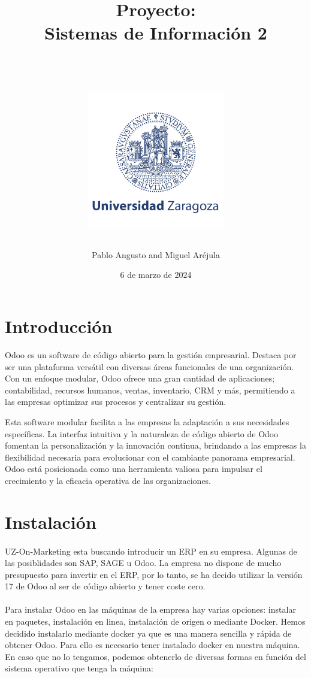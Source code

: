\documentclass[paper=a4wide, fontsize=11pt]{report}	 %
\title{
{\Huge \textbf{Proyecto: 
\\ Sistemas de Información 2}}\\
\vspace{1cm}
\vspace{1cm}
\text{Pablo Angusto\quad\href{mailto:842255@unizar.es}{842255@unizar.es}}\\
\text{Miguel Aréjula\quad\href{mailto:850068@unizar.es}{850068@unizar.es}}\\
\includegraphics[width=6cm]{logo.png}\\
\date{6 de marzo de 2024}



}
\begin{document}
\author{Pablo Angusto and Miguel Aréjula}
\maketitle %
\tableofcontents
\newpage
\thispagestyle{fancy} %

\vspace{-0.5cm}

\section{Introducción}

Odoo es un software de código abierto para la gestión empresarial. Destaca por ser una plataforma versátil con diversas áreas funcionales de una organización. Con un enfoque modular, Odoo ofrece una gran cantidad de aplicaciones; contabilidad, recursos humanos, ventas, inventario, CRM y más, permitiendo a las empresas optimizar sus procesos y centralizar su gestión.


Esta software modular facilita a las empresas la adaptación a sus necesidades específicas. La interfaz intuitiva y la naturaleza de código abierto de Odoo fomentan la personalización y la innovación continua, brindando a las empresas la flexibilidad necesaria para evolucionar con el cambiante panorama empresarial. Odoo está posicionada como una herramienta valiosa para impulsar el crecimiento y la eficacia operativa de las organizaciones.

\section{Instalación}
\paragraph{}
UZ-On-Marketing esta buscando introducir un ERP en su empresa. Algunas de las posiblidades son SAP, SAGE u Odoo. La empresa no dispone de mucho presupuesto para invertir en el ERP, por lo tanto, se ha decido utilizar la versión 17 de Odoo al ser de código abierto y tener coste cero.

\paragraph{}
Para instalar Odoo en las máquinas de la empresa hay varias opciones: instalar en paquetes, instalación en linea, instalación de origen o mediante Docker.
Hemos decidido instalarlo mediante docker ya que es una manera sencilla y rápida de obtener Odoo. 
Para ello es necesario tener instalado docker en nuestra máquina. En caso que no lo tengamos, podemos obtenerlo de diversas formas en función del  sistema operativo que tenga la máquina: 
\end{document}
